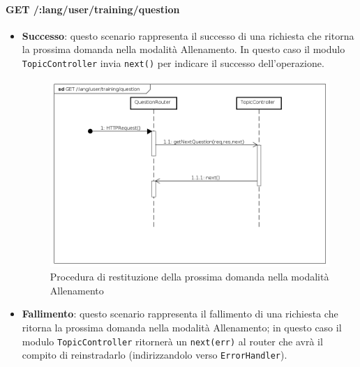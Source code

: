 \paragraph{GET /:lang/user/training/question} %
\begin{itemize}
\item \textbf{Successo}: questo scenario rappresenta il successo di una richiesta che ritorna la prossima domanda nella modalità Allenamento. In questo caso il modulo \texttt{TopicController} invia \texttt{next()} per indicare il successo dell'operazione.

\begin{figure}[ht]
	\centering
	\includegraphics[scale=0.45]{UML/DiagrammiDiSequenza/Back-end/GET__lang_user_training_question_success.png}
	\caption{Procedura di restituzione della prossima domanda nella modalità Allenamento}
\end{figure}
\FloatBarrier

\item \textbf{Fallimento}: questo scenario rappresenta il fallimento di una richiesta che ritorna la prossima domanda nella modalità Allenamento; in questo caso il modulo \texttt{TopicController} ritornerà un \texttt{next(err)} al router che avrà il compito di reinstradarlo (indirizzandolo verso \texttt{ErrorHandler}).


\end{itemize}
